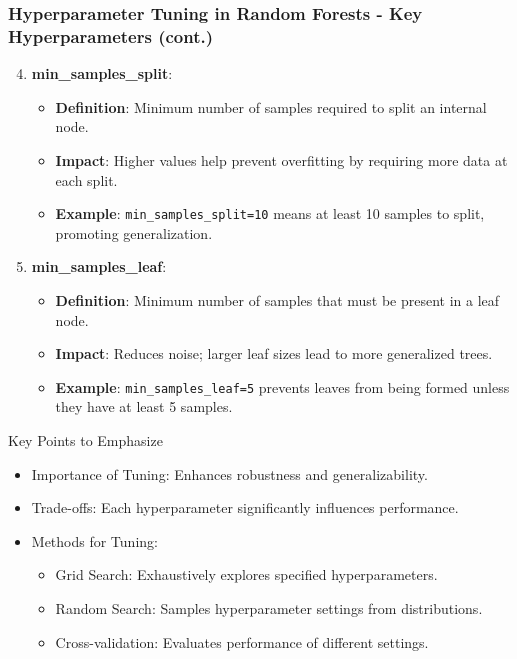 \documentclass[aspectratio=169]{beamer}
\begin{document}
\begin{frame}[fragile]
    \frametitle{Hyperparameter Tuning in Random Forests - Key Hyperparameters (cont.)}
    \begin{enumerate}
        \setcounter{enumi}{3} %
        \item \textbf{min\_samples\_split}:
            \begin{itemize}
                \item \textbf{Definition}: Minimum number of samples required to split an internal node.
                \item \textbf{Impact}: Higher values help prevent overfitting by requiring more data at each split.
                \item \textbf{Example}: \texttt{min\_samples\_split=10} means at least 10 samples to split, promoting generalization.
            \end{itemize}

        \item \textbf{min\_samples\_leaf}:
            \begin{itemize}
                \item \textbf{Definition}: Minimum number of samples that must be present in a leaf node.
                \item \textbf{Impact}: Reduces noise; larger leaf sizes lead to more generalized trees.
                \item \textbf{Example}: \texttt{min\_samples\_leaf=5} prevents leaves from being formed unless they have at least 5 samples.
            \end{itemize}
    \end{enumerate}

    \begin{block}{Key Points to Emphasize}
        \begin{itemize}
            \item Importance of Tuning: Enhances robustness and generalizability.
            \item Trade-offs: Each hyperparameter significantly influences performance.
            \item Methods for Tuning:
            \begin{itemize}
                \item Grid Search: Exhaustively explores specified hyperparameters.
                \item Random Search: Samples hyperparameter settings from distributions.
                \item Cross-validation: Evaluates performance of different settings.
            \end{itemize}
        \end{itemize}
    \end{block}
\end{frame}
\end{document}
